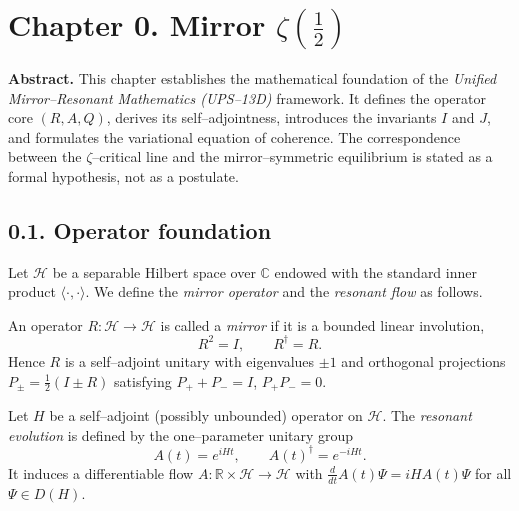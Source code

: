 
\section*{Chapter 0. Mirror $\zeta(\tfrac12)$}

\noindent
\textbf{Abstract.}
This chapter establishes the mathematical foundation of the \emph{Unified Mirror–Resonant Mathematics (UPS–13D)} framework.
It defines the operator core $(R, A, Q)$, derives its self–adjointness, introduces the invariants $I$ and $J$, and formulates the variational equation of coherence.
The correspondence between the $\zeta$–critical line and the mirror–symmetric equilibrium is stated as a formal hypothesis, not as a postulate.

\subsection*{0.1. Operator foundation}
Let $\mathcal{H}$ be a separable Hilbert space over $\mathbb{C}$ endowed with the standard inner product $\langle \cdot , \cdot \rangle$.
We define the \emph{mirror operator} and the \emph{resonant flow} as follows.

\begin{definition}
An operator $R:\mathcal{H}\to\mathcal{H}$ is called a \emph{mirror} if it is a bounded linear involution,
\[
R^2 = I, \qquad R^\dagger = R.
\]
Hence $R$ is a self–adjoint unitary with eigenvalues $\pm1$ and orthogonal projections
$P_\pm = \tfrac12(I \pm R)$ satisfying $P_+ + P_- = I$, $P_+P_- = 0$.
\end{definition}

\begin{definition}
Let $H$ be a self–adjoint (possibly unbounded) operator on $\mathcal{H}$.
The \emph{resonant evolution} is defined by the one–parameter unitary group
\[
A(t) = e^{i H t}, \qquad A(t)^\dagger = e^{-i H t}.
\]
It induces a differentiable flow $A:\mathbb{R}\times\mathcal{H}\to\mathcal{H}$ with
$\frac{d}{dt}A(t)\Psi = iH A(t)\Psi$ for all $\Psi\in D(H)$.
\end{definition}

